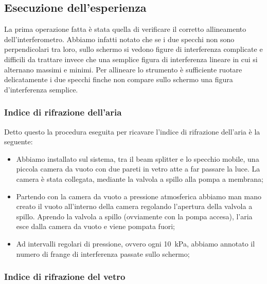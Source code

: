 \subsection{Esecuzione dell'esperienza}

La prima operazione fatta è stata quella di verificare il corretto allineamento dell'interferometro. Abbiamo infatti notato che se i due specchi non sono perpendicolari tra loro, sullo schermo si vedono figure di interferenza complicate e difficili da trattare invece che una semplice figura di interferenza lineare in cui si alternano massimi e minimi. Per allineare lo strumento è sufficiente ruotare delicatamente i due specchi finche non compare sullo schermo una figura d'interferenza semplice.


\subsubsection{Indice di rifrazione dell'aria}

Detto questo la procedura eseguita per ricavare l'indice di rifrazione dell'aria è la seguente:
\begin{itemize}
	\item{Abbiamo installato sul sistema, tra il beam splitter e lo specchio mobile, una piccola camera da vuoto con due pareti in vetro atte a far passare la luce. La camera è stata collegata, mediante la valvola a spillo alla pompa a membrana;}
    \item{Partendo con la camera da vuoto a pressione atmosferica abbiamo man mano creato il vuoto all'interno della camera regolando l'apertura della valvola a spillo. Aprendo la valvola a spillo (ovviamente con la pompa accesa), l'aria esce dalla camera da vuoto e viene pompata fuori;}
    \item{Ad intervalli regolari di pressione, ovvero ogni \SI{10}{\kilo\pascal}, abbiamo annotato il numero di frange di interferenza passate sullo schermo;}
\end{itemize}

\subsubsection{Indice di rifrazione del vetro}

